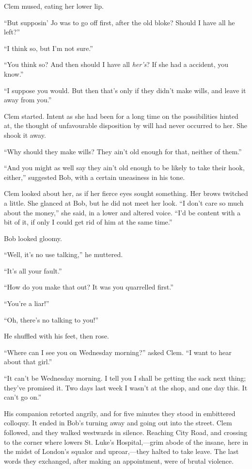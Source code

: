 Clem mused, eating her lower lip.

``But supposin' Jo was to go off first, after the old bloke? Should I
have all he left?''

``I think so, but I'm not sure.''

``You think so? And then should I have all \emph{her's}? If she had a
accident, you know.''

``I suppose you would. But then that's only if they didn't make wills,
and leave it away from you.''

Clem started. Intent as she had been for a long time on the
possibilities hinted at, the thought of unfavourable disposition by will
had never occurred to her. She shook it away.

{}``Why should they make wills? They ain't old enough for that, neither
of them.''

``And you might as well say they ain't old enough to be likely to take
their hook, either,'' suggested Bob, with a certain uneasiness in his
tone.

Clem looked about her, as if her fierce eyes sought something. Her brows
twitched a little. She glanced at Bob, but he did not meet her look. ``I
don't care so much about the money,'' she said, in a lower and altered
voice. ``I'd be content with a bit of it, if only I could get rid of him
at the same time.''

Bob looked gloomy.

``Well, it's no use talking,'' he muttered.

``It's all your fault.''

``How do you make that out? It was you quarrelled first.''

``You're a liar!''

``Oh, there's no talking to you!''

He shuffled with his feet, then rose.

``Where can I see you on Wednesday morning?'' asked Clem. ``I want to
hear about that girl.''

``It can't be Wednesday morning. I tell you I shall be getting the sack
next thing; they've {}promised it. Two days last week I wasn't at the
shop, and one day this. It can't go on.''

His companion retorted angrily, and for five minutes they stood in
embittered colloquy. It ended in Bob's turning away and going out into
the street. Clem followed, and they walked westwards in silence.
Reaching City Road, and crossing to the corner where lowers St. Luke's
Hospital,---grim abode of the insane, here in the midst of London's
squalor and uproar,---they halted to take leave. The last words they
exchanged, after making an appointment, were of brutal violence.

